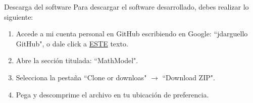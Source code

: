 \begin{frame}[t]{Descarga del software}\vspace{5pt}
Para descargar el software desarrollado, debes realizar lo siguiente:

\begin{enumerate}
	\item Accede a mi cuenta personal en GitHub escribiendo en Google: ``jdarguello GitHub", o dale click a \href{https://github.com/jdarguello?tab=overview&from=2018-10-01to=2018-10-31}{{\color[rgb]{1,0,0} ESTE}} texto.
	\item Abre la secci\'on titulada: ``MathModel".
	\item Selecciona la pesta\~na ``Clone or downloas" $\rightarrow$ ``Download ZIP".
	\item Pega y descomprime el archivo en tu ubicaci\'on de preferencia.
\end{enumerate}

\end{frame}